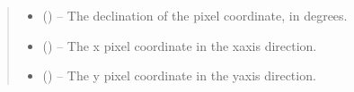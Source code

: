 \documentclass[letterpaper,11pt,english]{sphinxmanual}
\begin{document}
\begin{savenotes}
\begin{fulllineitems}
\begin{savenotes}
\begin{fulllineitems}
\begin{quote}
\begin{description}
\begin{itemize}
\item {} 
\sphinxAtStartPar
{} () – The declination of the pixel coordinate, in degrees.

\end{itemize}

\sphinxAtStartPar
\begin{itemize}
\item {} 
\sphinxAtStartPar
{} () – The x pixel coordinate in the x\sphinxhyphen{}axis direction.

\item {} 
\sphinxAtStartPar
{} () – The y pixel coordinate in the y\sphinxhyphen{}axis direction.

\end{itemize}


\end{description}\end{quote}

\end{fulllineitems}\end{savenotes}


\end{fulllineitems}\end{savenotes}

\end{document}

